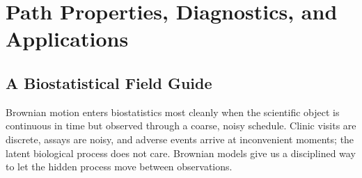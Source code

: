 \documentclass{article}
\theoremstyle{plain}
\theoremstyle{definition}
\begin{document}
\section{Path Properties, Diagnostics, and Applications}

\subsection{A Biostatistical Field Guide}

Brownian motion enters biostatistics most cleanly when the scientific object is continuous in time but observed through a coarse, noisy schedule. Clinic visits are discrete, assays are noisy, and adverse events arrive at inconvenient moments; the latent biological process does not care. Brownian models give us a disciplined way to let the hidden process move between observations.
\end{document}
